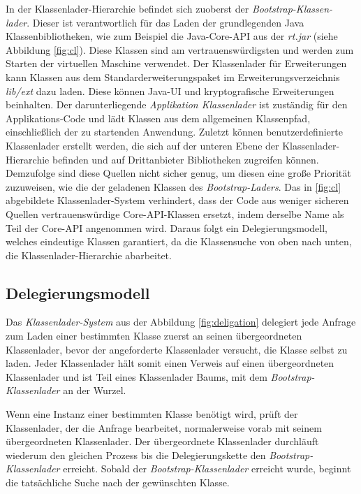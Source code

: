     In der Klassenlader-Hierarchie befindet sich zuoberst der \textit{Bootstrap-Klassen- lader}. Dieser ist verantwortlich für das Laden der grundlegenden Java Klassenbibliotheken, wie zum Beispiel die Java-Core-API aus der \textit{rt.jar} (siehe Abbildung \ref{fig:cl}). Diese Klassen sind am vertrauenswürdigsten und werden zum Starten der virtuellen Maschine verwendet. Der Klassenlader für Erweiterungen kann Klassen  aus dem Standarderweiterungspaket im Erweiterungsverzeichnis \textit{lib/ext} dazu laden. Diese können Java-UI und kryptografische Erweiterungen beinhalten. Der darunterliegende \textit{Applikation Klassenlader} ist zuständig für den Applikations-Code und lädt Klassen aus dem allgemeinen Klassenpfad, einschließlich der zu startenden Anwendung. Zuletzt können benutzerdefinierte Klassenlader erstellt werden, die sich auf der unteren Ebene der Klassenlader-Hierarchie befinden und auf Drittanbieter Bibliotheken zugreifen können. Demzufolge sind diese Quellen nicht sicher genug, um diesen eine große Priorität zuzuweisen, wie die der geladenen Klassen des \textit{Bootstrap-Laders}. \bigbreak 
    Das in \ref{fig:cl} abgebildete Klassenlader-System verhindert, dass der Code aus weniger sicheren Quellen vertrauenswürdige Core-API-Klassen ersetzt, indem derselbe Name als Teil der Core-API angenommen wird. Daraus folgt ein Delegierungsmodell, welches eindeutige Klassen garantiert, da die Klassensuche von oben nach unten, die Klassenlader-Hierarchie abarbeitet. \cite{classLoadingIntro} 
    

  \subsection{Delegierungsmodell} \label{sec:dm}
    
    Das \textit{Klassenlader-System} aus der Abbildung \ref{fig:deligation} delegiert jede Anfrage zum Laden einer bestimmten Klasse zuerst an seinen übergeordneten Klassenlader, bevor der angeforderte Klassenlader versucht, die Klasse selbst zu laden. Jeder Klassenlader hält somit einen Verweis auf einen übergeordneten Klassenlader und ist Teil eines Klassenlader Baums, mit dem \textit{Bootstrap-Klassenlader} an der Wurzel. 

    Wenn eine Instanz einer bestimmten Klasse benötigt wird, prüft der Klassenlader, der die Anfrage bearbeitet, normalerweise vorab mit seinem übergeordneten Klassenlader. Der übergeordnete Klassenlader durchläuft wiederum den gleichen Prozess bis die Delegierungskette den \textit{Bootstrap-Klassenlader} erreicht. Sobald der \textit{Bootstrap-Klassenlader} erreicht wurde, beginnt die tatsächliche Suche nach der gewünschten Klasse.

